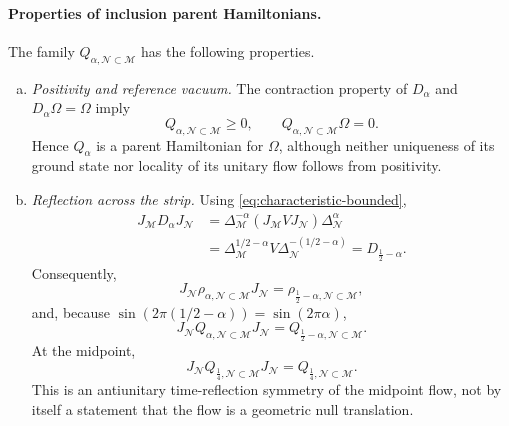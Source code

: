 \documentclass[a4paper,11pt]{article}
\theoremstyle{definition}
\newcommand{\mN}{\mathcal{N}}
\newcommand{\mM}{\mathcal{M}}
\begin{document}
\paragraph{Properties of inclusion parent Hamiltonians.}
The family $Q_{\alpha,\mN\subset\mM}$ has the following properties.
\begin{enumerate}[(a)]
\item \emph{Positivity and reference vacuum.}
The contraction property of $D_\alpha$ and
$D_\alpha\Omega=\Omega$ imply
\begin{equation}
    Q_{\alpha,\mN\subset\mM}\geq0,
    \qquad
    Q_{\alpha,\mN\subset\mM}\Omega=0.
    \label{eq:Q-parent-positive-property}
\end{equation}
Hence $Q_\alpha$ is a parent Hamiltonian for $\Omega$, although
neither uniqueness of its ground state nor locality of its unitary
flow follows from positivity.

\item \emph{Reflection across the strip.}
Using \eqref{eq:characteristic-bounded},
\begin{align}
    J_{\mM}D_\alpha J_{\mN}
    &=
    \Delta_{\mM}^{-\alpha}
    (J_{\mM}VJ_{\mN})
    \Delta_{\mN}^\alpha
    \nonumber\\
    &=
    \Delta_{\mM}^{1/2-\alpha}
    V\Delta_{\mN}^{-(1/2-\alpha)}
    =D_{\frac12-\alpha}.
    \label{eq:W-reflection}
\end{align}
Consequently,
\begin{equation}
    \boxed{
    J_{\mN}\rho_{\alpha,\mN\subset\mM}J_{\mN}
    =\rho_{\frac12-\alpha,\mN\subset\mM},
    }
    \label{eq:rho-reflection}
\end{equation}
and, because $\sin(2\pi(1/2-\alpha))=\sin(2\pi\alpha)$,
\begin{equation}
    \boxed{
    J_{\mN}Q_{\alpha,\mN\subset\mM}J_{\mN}
    =Q_{\frac12-\alpha,\mN\subset\mM}.
    }
    \label{eq:H-reflection}
\end{equation}
At the midpoint,
\begin{equation}
    J_{\mN}Q_{\frac14,\mN\subset\mM}J_{\mN}
    =Q_{\frac14,\mN\subset\mM}.
    \label{eq:H-quarter-real}
\end{equation}
This is an antiunitary time-reflection symmetry of the midpoint flow,
not by itself a statement that the flow is a geometric null translation.


\end{enumerate}
\end{document}
